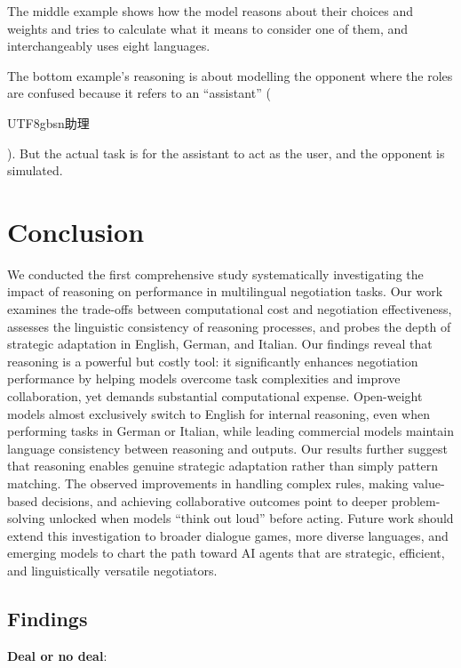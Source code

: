 \documentclass[11pt]{article}
\begin{document}
The middle example shows how the model reasons about their choices and weights and tries to calculate what it means to consider one of them, and interchangeably uses eight languages.

The bottom example's reasoning is about modelling the opponent where the roles are confused because it refers to an ``assistant'' (\begin{CJK*}{UTF8}{gbsn}助理\end{CJK*}). But the actual task is for the assistant to act as the user, and the opponent is simulated.





\section{Conclusion}

We conducted the first comprehensive study systematically investigating the impact of reasoning on performance in multilingual negotiation tasks. Our work examines the trade-offs between computational cost and negotiation effectiveness, assesses the linguistic consistency of reasoning processes, and probes the depth of strategic adaptation in English, German, and Italian. Our findings reveal that reasoning is a powerful but costly tool: it significantly enhances negotiation performance by helping models overcome task complexities and improve collaboration, yet demands substantial computational expense. 
Open-weight models almost exclusively switch to English for internal reasoning, even when performing tasks in German or Italian, while leading commercial models maintain language consistency between reasoning and outputs. Our results further suggest that reasoning enables genuine strategic adaptation rather than simply pattern matching. The observed improvements in handling complex rules, making value-based decisions, and achieving collaborative outcomes point to deeper problem-solving unlocked when models ``think out loud'' before acting. Future work should extend this investigation to broader dialogue games, more diverse languages, and emerging models to chart the path toward AI agents that are strategic, efficient, and linguistically versatile negotiators.

\subsection{Findings}

\textbf{Deal or no deal}:
\end{document}
